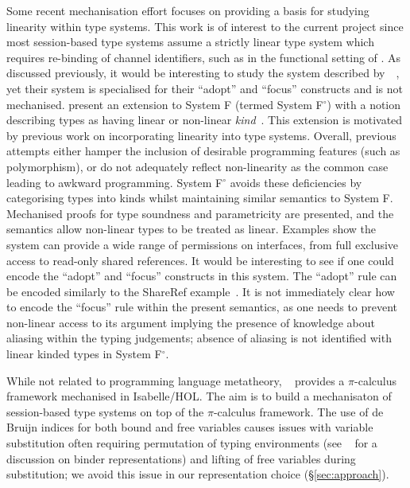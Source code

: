 \documentclass{mprop}
\newcommand{\fpop}{System F${}^\circ$\xspace}
\begin{document}
Some recent mechanisation effort focuses on providing a basis for studying linearity within type systems. This work is of interest to the current project since most session-based type systems assume a strictly linear type system which requires re-binding of channel identifiers, such as in the functional setting of \citeauthor{Gay:2010:LAST}. As discussed previously, it would be interesting to study the system described by~\citeauthor{Fahndrich:2002}~\cite{Fahndrich:2002}, yet their system is specialised for their ``adopt'' and ``focus'' constructs and is not mechanised. \citeauthor{Mazurak:2010:LLT} present an extension to System F (termed \fpop) with a notion describing types as having linear or non-linear \textit{kind}~\cite{Mazurak:2010:LLT}. This extension is motivated by previous work on incorporating linearity into type systems. Overall, previous attempts either hamper the inclusion of desirable programming features (such as polymorphism), or do not adequately reflect non-linearity as the common case leading to awkward programming. \fpop avoids these deficiencies by categorising types into kinds whilst maintaining similar semantics to System F. Mechanised proofs for type soundness and parametricity are presented, and the semantics allow non-linear types to be treated as linear. Examples show the system can provide a wide range of permissions on interfaces, from full exclusive access to read-only shared references. It would be interesting to see if one could encode the ``adopt'' and ``focus'' constructs in this system. The ``adopt'' rule can be encoded similarly to the ShareRef example~\cite{Mazurak:2010:LLT}. It is not immediately clear how to encode the ``focus'' rule within the present semantics, as one needs to prevent non-linear access to its argument implying the presence of knowledge about aliasing within the typing judgements; absence of aliasing is not identified with linear kinded types in \fpop.

While not related to programming language metatheory, \citeauthor{Gay:2001:FFP}~\cite{Gay:2001:FFP} provides a $\pi$-calculus framework mechanised in Isabelle/HOL. The aim is to build a mechanisaton of session-based type systems on top of the $\pi$-calculus framework. The use of de Bruijn indices for both bound and free variables causes issues with variable substitution often requiring permutation of typing environments (see \citeauthor{Aydemir:2008:EFM}~\cite{Aydemir:2008:EFM} for a discussion on binder representations) and lifting of free variables during substitution; we avoid this issue in our representation choice (\S \ref{sec:approach}).
\end{document}
